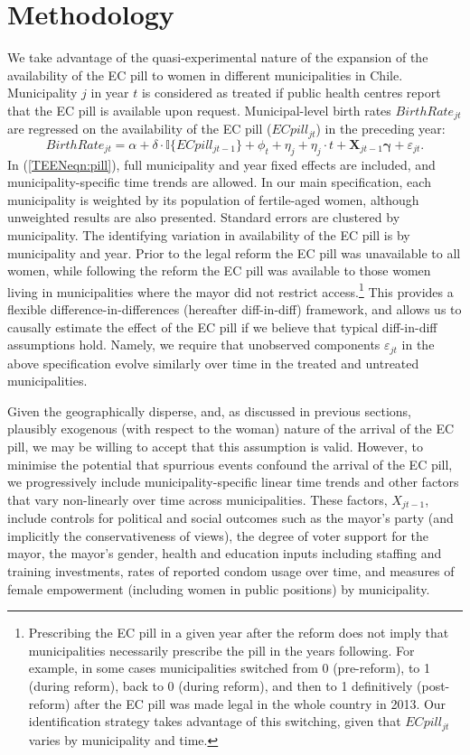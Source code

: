 \section{Methodology}
\label{TEENscn:ID}
We take advantage of the quasi-experimental nature of the expansion of the 
availability of the EC pill to women in different municipalities in Chile.
Municipality $j$ in year $t$ is considered as treated if public health centres
report that the EC pill is available upon request.  Municipal-level birth
rates $BirthRate_{jt}$ are regressed on the availability of the EC pill
($ECpill_{jt}$) in the preceding year:
\begin{equation}
 \label{TEENeqn:pill}
BirthRate_{jt} = \alpha + \delta\cdot \mathbb{I}\{ECpill_{jt-1}\} + \phi_t +
  \eta_j + \eta_j\cdot t + \bm{X}_{jt-1}\bm{\gamma} + \varepsilon_{jt}.
\end{equation}
In (\ref{TEENeqn:pill}), full municipality and year fixed effects are included,
and municipality-specific time trends are allowed.  In our main specification,
each municipality is weighted by its population of fertile-aged women, although
unweighted results are also presented. Standard errors are clustered by
municipality.  The identifying variation in availability of the EC pill is by
municipality and year.  Prior to the legal reform the EC pill was unavailable to
all women, while following the reform the EC pill was available to those women
living in municipalities where the mayor did not restrict access.\footnote{%
Prescribing the EC pill in a given year after the reform does not imply that
municipalities necessarily prescribe the pill in the years following.  For
example, in some cases municipalities switched from 0 (pre-reform), to 1 (during
reform), back to 0 (during reform), and then to 1 definitively (post-reform)
after the EC pill was made legal in the whole country in 2013. Our identification
strategy takes advantage of this switching, given that $ECpill_{jt}$ varies by
municipality and time.}  This provides a flexible difference-in-differences
(hereafter diff-in-diff) framework, and allows us to causally estimate the effect
of the EC pill if we believe that typical diff-in-diff assumptions hold.  Namely,
we require that unobserved components $\varepsilon_{jt}$ in the above
specification evolve similarly over time in the treated and untreated
municipalities.

Given the geographically disperse, and, as discussed in previous sections,
plausibly exogenous (with respect to the woman) nature of the arrival of the 
EC pill, we may be willing to accept that this assumption is valid.  However,
to minimise the potential that spurrious events confound the arrival of the EC
pill, we progressively include municipality-specific linear time trends and other
factors that vary non-linearly over time across municipalities. These factors,
$X_{jt-1}$, include controls for political and social outcomes such as the
mayor's party (and implicitly the conservativeness of views), the degree of voter
support for the mayor, the mayor's gender, health and education inputs including
staffing and training investments, rates of reported condom usage over time, and
measures of female empowerment (including women in public positions)
by municipality.

